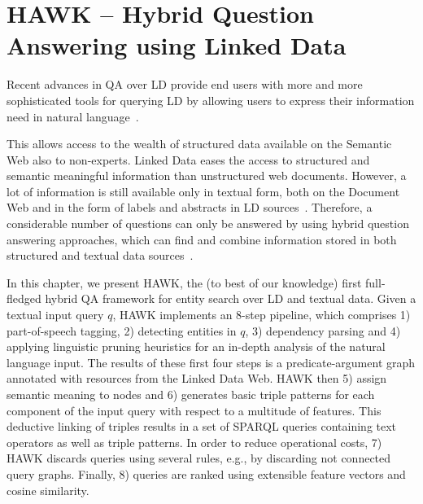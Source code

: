\chapter{HAWK -- Hybrid Question Answering using Linked Data}



Recent advances in \ac{QA} over \ac{LD} provide end users with more and more sophisticated tools for querying \ac{LD} by allowing users to express their information need in natural language~\cite{SINA_WebSemantic,pythia,template}. 

This allows access to the wealth of structured data available on the Semantic Web also to non-experts. 
Linked Data eases the access to structured and semantic meaningful information than unstructured web documents.
However, a lot of information is still available only in textual form, both on the Document Web and in the form of labels and abstracts in \ac{LD} sources~\cite{GER+13}.
Therefore, a considerable number of questions can only be answered by using hybrid question answering approaches, which  can find and combine information stored in both structured and textual data sources~\cite{combiningLDandIR}.

In this chapter, we present HAWK, the (to best of our knowledge) first full-fledged hybrid QA framework for entity search over \ac{LD} and textual data. 
Given a textual input query $q$, HAWK implements an 8-step pipeline, which comprises 1) part-of-speech tagging, 2) detecting entities in $q$, 3) dependency parsing and 4) applying linguistic pruning heuristics for an in-depth analysis of the natural language input. 
The results of these first four steps is a predicate-argument graph annotated with resources from the Linked Data Web. HAWK then 5) assign semantic meaning to nodes and 6) generates basic triple patterns for each component of the input query with respect to a multitude of features. 
This deductive linking of triples results in a set of SPARQL queries containing text operators as well as triple patterns.
In order to reduce operational costs, 7) HAWK discards queries using several rules, e.g., by  discarding not connected query graphs.
Finally, 8) queries are ranked using extensible feature vectors and cosine similarity.

